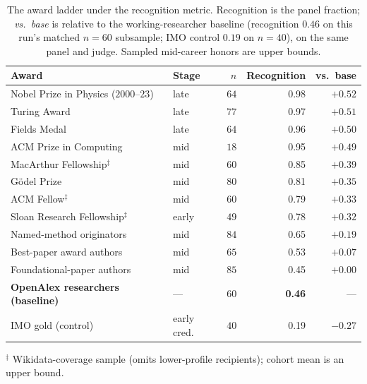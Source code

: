 \begin{table}[!htbp]
\centering
\small
\caption{The award ladder under the recognition metric. Recognition is the panel fraction; \emph{vs.\ base} is relative to the working-researcher baseline (recognition $0.46$ on this run's matched $n{=}60$ subsample; IMO control $0.19$ on $n{=}40$), on the same panel and judge. Sampled mid-career honors are upper bounds.}
\label{tab:award-ladder}
\begin{tabular}{llrrr}
\toprule
Award & Stage & $n$ & Recognition & vs.\ base \\
\midrule
Nobel Prize in Physics ($2000$--$23$) & late & $64$ & 0.98 & $+0.52$ \\
Turing Award & late & $77$ & 0.97 & $+0.51$ \\
Fields Medal & late & $64$ & 0.96 & $+0.50$ \\
ACM Prize in Computing & mid & $18$ & 0.95 & $+0.49$ \\
MacArthur Fellowship$^\ddagger$ & mid & $60$ & 0.85 & $+0.39$ \\
G\"odel Prize & mid & $80$ & 0.81 & $+0.35$ \\
ACM Fellow$^\ddagger$ & mid & $60$ & 0.79 & $+0.33$ \\
Sloan Research Fellowship$^\ddagger$ & early & $49$ & 0.78 & $+0.32$ \\
Named-method originators & mid & $84$ & 0.65 & $+0.19$ \\
Best-paper award authors & mid & $65$ & 0.53 & $+0.07$ \\
Foundational-paper authors & mid & $85$ & 0.45 & $+0.00$ \\
\textbf{OpenAlex researchers (baseline)} & --- & $60$ & \textbf{0.46} & --- \\
IMO gold (control) & early cred. & $40$ & 0.19 & $-0.27$ \\
\bottomrule
\end{tabular}

\vspace{2pt}
{\footnotesize $^\ddagger$ Wikidata-coverage sample (omits lower-profile recipients); cohort mean is an upper bound.}
\end{table}

